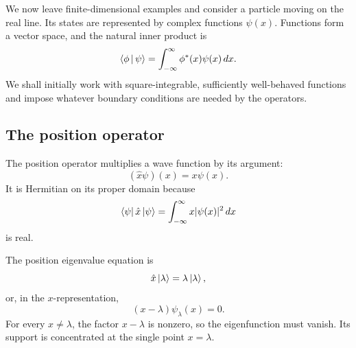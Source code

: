 We now leave finite-dimensional examples and consider a particle moving on
the real line. Its states are represented by complex functions \(\psi(x)\).
Functions form a vector space, and the natural inner product is
\begin{equation}
  \left\langle\phi\,\middle|\,\psi\right\rangle
  =
  \int_{-\infty}^{\infty}\phi^*(x)\psi(x)\,dx.
  \label{eq:function-inner-product}
\end{equation}
We shall initially work with square-integrable, sufficiently well-behaved
functions and impose whatever boundary conditions are needed by the
operators.

\begin{classroomqa}
\end{classroomqa}

\subsection{The position operator}

The position operator multiplies a wave function by its argument:
\begin{equation}
  (\hat x\psi)(x)=x\psi(x).
  \label{eq:position-operator}
\end{equation}
It is Hermitian on its proper domain because
\begin{equation}
  \left\langle\psi\right\rvert\hat x\left\lvert\psi\right\rangle
  =
  \int_{-\infty}^{\infty}x|\psi(x)|^2\,dx
\end{equation}
is real.

The position eigenvalue equation is
\begin{equation}
  \hat x\left\lvert\lambda\right\rangle=\lambda\left\lvert\lambda\right\rangle,
\end{equation}
or, in the \(x\)-representation,
\begin{equation}
  (x-\lambda)\psi_\lambda(x)=0.
  \label{eq:position-eigenvalue}
\end{equation}
For every \(x\neq\lambda\), the factor \(x-\lambda\) is nonzero, so the
eigenfunction must vanish. Its support is concentrated at the single point
\(x=\lambda\).

\begin{classroomqa}
\end{classroomqa}

